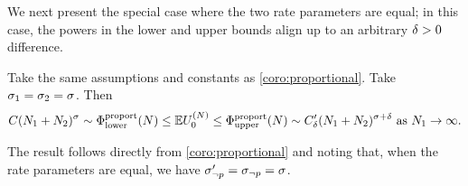 We next present the special case where the two rate parameters are equal; in this case, the powers in the lower and upper bounds align up to an arbitrary $\delta > 0$ difference.
\begin{myCorollary}
    \label{coro:proportional_power-law-rate-align}
    Take the same assumptions and constants as \cref{coro:proportional}. Take $\sigma_{1}=\sigma_{2}=\sigma_{}$. Then
    \begin{equation*}
        C(\samplesize{1}+\samplesize{2})^{\rate{}} \sim \lowerboundproport(\vecsamplesize)
        		\le \E \news{\zerovec}{\vecsamplesize}
		\le \upperboundproport(\vecsamplesize) \sim C'_{\smallpositive}(\samplesize{1}+\samplesize{2})^{\rate{}+\smallpositive} \textrm{\ as } \samplesize{1} \to \infty.
    \end{equation*} 
\end{myCorollary}


The result follows directly from \cref{coro:proportional} and noting that, when the rate parameters are equal, we have $\sigma_{\neg p}' = \sigma_{\neg p} = \sigma_{}$.

